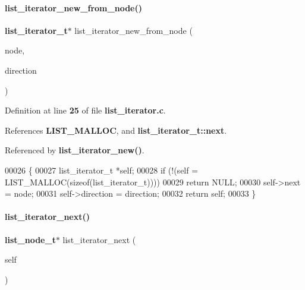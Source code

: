 \paragraph{list\+\_\+iterator\+\_\+new\+\_\+from\+\_\+node()}
{\footnotesize\ttfamily \textbf{ list\+\_\+iterator\+\_\+t}$\ast$ list\+\_\+iterator\+\_\+new\+\_\+from\+\_\+node (\begin{DoxyParamCaption}\item[{\textbf{ list\+\_\+node\+\_\+t} $\ast$}]{node,  }\item[{\textbf{ list\+\_\+direction\+\_\+t}}]{direction }\end{DoxyParamCaption})}



Definition at line \textbf{ 25} of file \textbf{ list\+\_\+iterator.\+c}.



References \textbf{ L\+I\+S\+T\+\_\+\+M\+A\+L\+L\+OC}, and \textbf{ list\+\_\+iterator\+\_\+t\+::next}.



Referenced by \textbf{ list\+\_\+iterator\+\_\+new()}.


\begin{DoxyCode}
00026                                                                          \{
00027   list_iterator_t *\textcolor{keyword}{self};
00028   \textcolor{keywordflow}{if} (!(\textcolor{keyword}{self} = LIST_MALLOC(\textcolor{keyword}{sizeof}(list_iterator_t))))
00029     \textcolor{keywordflow}{return} NULL;
00030   \textcolor{keyword}{self}->next = node;
00031   \textcolor{keyword}{self}->direction = direction;
00032   \textcolor{keywordflow}{return} \textcolor{keyword}{self};
00033 \}
\end{DoxyCode}
\mbox{\label{a00113_a2e5db981e32d3aef49ea79505a0615a6}} 
\paragraph{list\+\_\+iterator\+\_\+next()}
{\footnotesize\ttfamily \textbf{ list\+\_\+node\+\_\+t}$\ast$ list\+\_\+iterator\+\_\+next (\begin{DoxyParamCaption}\item[{\textbf{ list\+\_\+iterator\+\_\+t} $\ast$}]{self }\end{DoxyParamCaption})}



